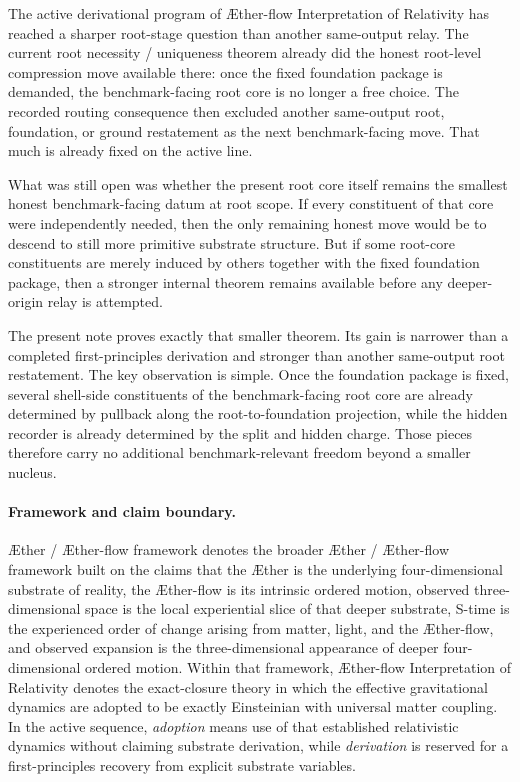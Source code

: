 \documentclass[11pt]{article}
\newcommand{\Aether}{\AE{}ther}
\newcommand{\Aflow}{\AE{}ther-flow}
\newcommand{\TheoryName}{\Aflow{} Interpretation of Relativity}
\newcommand{\TheoryProgram}{\Aether{} / \Aflow{} framework}
\begin{document}
The active derivational program of \TheoryName{} has reached a sharper root-stage question than another same-output relay. The current root necessity / uniqueness theorem already did the honest root-level compression move available there: once the fixed foundation package is demanded, the benchmark-facing root core is no longer a free choice. The recorded routing consequence then excluded another same-output root, foundation, or ground restatement as the next benchmark-facing move. That much is already fixed on the active line.

What was still open was whether the present root core itself remains the smallest honest benchmark-facing datum at root scope. If every constituent of that core were independently needed, then the only remaining honest move would be to descend to still more primitive substrate structure. But if some root-core constituents are merely induced by others together with the fixed foundation package, then a stronger internal theorem remains available before any deeper-origin relay is attempted.

The present note proves exactly that smaller theorem. Its gain is narrower than a completed first-principles derivation and stronger than another same-output root restatement. The key observation is simple. Once the foundation package is fixed, several shell-side constituents of the benchmark-facing root core are already determined by pullback along the root-to-foundation projection, while the hidden recorder is already determined by the split and hidden charge. Those pieces therefore carry no additional benchmark-relevant freedom beyond a smaller nucleus.

\paragraph{Framework and claim boundary.}
\TheoryProgram{} denotes the broader \Aether{} / \Aflow{} framework built on the claims that the \Aether{} is the underlying four-dimensional substrate of reality, the \Aflow{} is its intrinsic ordered motion, observed three-dimensional space is the local experiential slice of that deeper substrate, S-time is the experienced order of change arising from matter, light, and the \Aflow{}, and observed expansion is the three-dimensional appearance of deeper four-dimensional ordered motion. Within that framework, \TheoryName{} denotes the exact-closure theory in which the effective gravitational dynamics are adopted to be exactly Einsteinian with universal matter coupling. In the active sequence, \emph{adoption} means use of that established relativistic dynamics without claiming substrate derivation, while \emph{derivation} is reserved for a first-principles recovery from explicit substrate variables.
\end{document}
